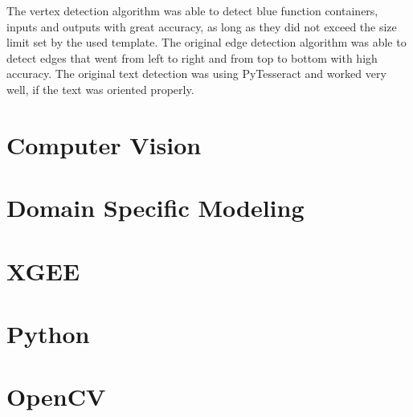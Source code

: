 The vertex detection algorithm was able to detect blue function containers, inputs and outputs with great accuracy, as long as they did not exceed the size limit set by the used template.
The original edge detection algorithm was able to detect edges that went from left to right and from top to bottom with high accuracy. 
The original text detection was using PyTesseract and worked very well, if the text was oriented properly.

\section{Computer Vision}
    
\section{Domain Specific Modeling}

\section{XGEE}

\section{Python}

\section{OpenCV}